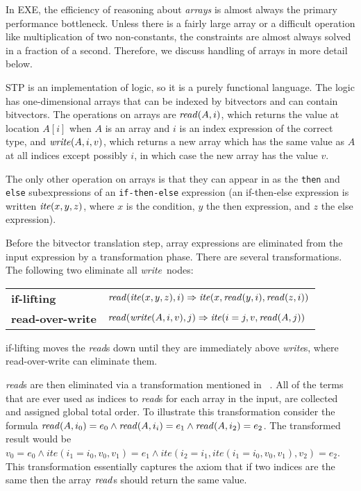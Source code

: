\documentclass[11pt]{article}
\newcommand{\stpread}{{\it read}}
\newcommand{\stpwrite}{{\it write}}
\newcommand{\stpite}{{\it ite}}
\begin{document}
In EXE, the efficiency of reasoning about {\em arrays\/} is almost
always the primary performance bottleneck.  Unless there is a
fairly large array or a difficult operation like multiplication of
two non-constants, the constraints are almost always solved in a
fraction of a second.  Therefore, we discuss handling of arrays 
in more detail below.


STP is an implementation of logic, so it is a purely functional
language.  The logic has one-dimensional arrays that can be
indexed by bitvectors and can contain bitvectors.  The operations on
arrays are $\stpread(A, i)$, which returns the value at location
$A[i]$ when $A$ is an array and $i$ is an index expression of the
correct type, and $\stpwrite(A, i, v)$, which returns a new array
which has the same value as $A$ at all indices except possibly $i$, in
which case the new array has the value $v$.  

The only other operation on arrays is that they can appear in as the
{\tt then} and {\tt else} subexpressions of an {\tt if-then-else}
expression (an if-then-else expression is written ${\it ite}(x, y,
z)$, where $x$ is the condition, $y$ the then expression, and $z$ the
else expression).

Before the bitvector translation step, array expressions are
eliminated from the input expression by a transformation phase.
There are several transformations.  The following two eliminate
all \stpwrite\ nodes:

\begin{tabular}{ll}

{\bf if-lifting} &  $\stpread(\stpite(x, y, z), i) 
	\Rightarrow \stpite(x, \stpread(y, i), \stpread(z, i))$  \\


{\bf read-over-write} &   $\stpread(\stpwrite(A, i, v), j) 
	\Rightarrow \stpite(i=j, v, \stpread(A, j))$ \\

\end{tabular}

if-lifting moves the {\stpread}s down until they are immediately above
{\stpwrite}s, where read-over-write can eliminate them.

{\stpread}s are then eliminated via a transformation mentioned in
~\cite{Uclid}.  All of the terms that are ever used as indices to
{\stpread}s for each array in the input, are collected and assigned
global total order. To illustrate this transformation consider the
formula $\stpread(A,i_0) = e_0 \wedge \stpread(A,i_i) = e_1 \wedge
\stpread(A,i_2)=e_2$. The transformed result would be $v_0 = e_0 \wedge
ite(i_1=i_0,v_0,v_1)=e_1 \wedge
ite(i_2=i_1,ite(i_1=i_0,v_0,v_1),v_2)=e_2$. This transformation
essentially captures the axiom that if two indices are the same then
the array $\stpread$s should return the same value.
\end{document}
